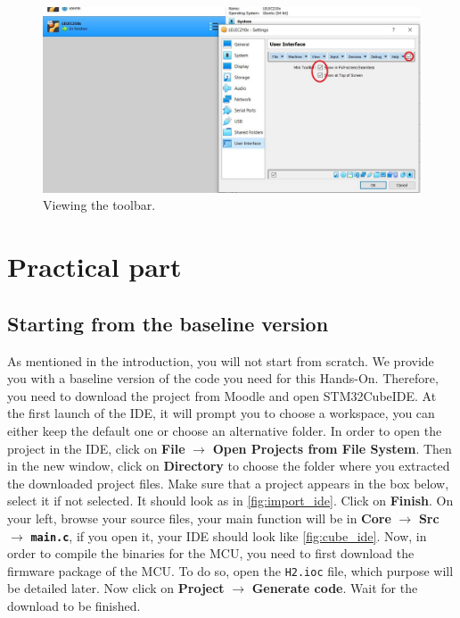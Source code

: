 \begin{figure}[H]
    \centering
    \includegraphics[width = 0.65\linewidth]{figures/toolbar.JPG}
    \caption{Viewing the toolbar.}
    \label{fig:toolbar}
\end{figure}
%
\section{Practical part}

\subsection{Starting from the baseline version}

As mentioned in the introduction, you will not start from scratch. We provide you with a  baseline version of the code you need for this Hands-On. Therefore, you need to download the project from Moodle and open STM32CubeIDE. At the first launch of the IDE, it will prompt you to choose a workspace, you can either keep the default one or choose an alternative folder. In order to open the project in the IDE, click on \textbf{File} $\rightarrow$ \textbf{Open Projects from File System}. Then in the new window, click on \textbf{Directory} to choose the folder where you extracted the downloaded project files. Make sure that a project appears in the box below, select it if not selected. It should look as in \autoref{fig:import_ide}. Click on \textbf{Finish}. On your left, browse your source files, your main function will be in \textbf{Core} $\rightarrow$ \textbf{Src} $\rightarrow$ \texttt{\textbf{main.c}}, if you open it, your IDE should look like \autoref{fig:cube_ide}. Now, in order to compile the binaries for the MCU, you need to first download the firmware package of the MCU. To do so, open the \texttt{H2.ioc} file, which purpose will be detailed later. Now click on \textbf{Project} $\rightarrow$ \textbf{Generate code}. Wait for the download to be finished.

